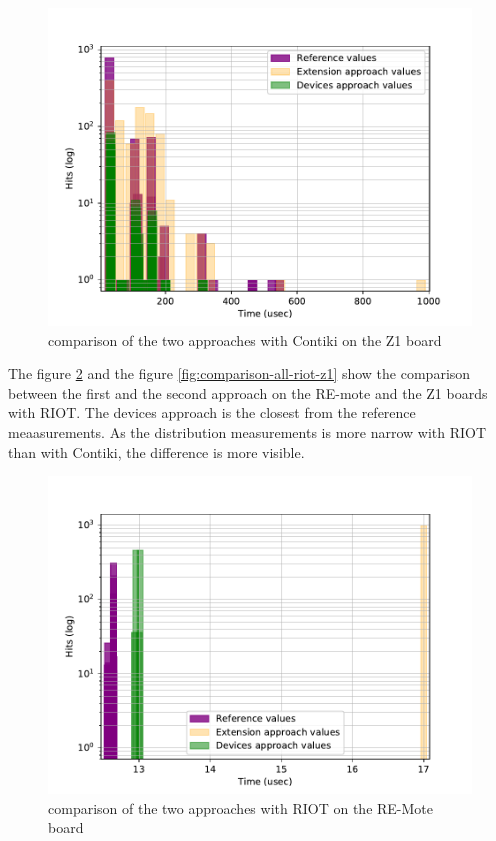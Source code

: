 \begin{figure}[!ht]
  \centering
  \includegraphics[scale=.7]{assets/comparison-all-contiki-z1.pdf}
  \caption{comparison of the two approaches with Contiki on the Z1 board\label{fig:comparison-all-contiki-z1}}
\end{figure}

The figure \ref{fig:comparison-all-riot-remote} and the figure \ref{fig:comparison-all-riot-z1} show the comparison between the first and the second approach on the RE-mote and the Z1 boards with RIOT.
The devices approach is the closest from the reference meaasurements.
As the distribution measurements is more narrow with RIOT than with Contiki, the difference is more visible.

\begin{figure}[!ht]
  \centering
  \includegraphics[scale=.7]{assets/comparison-all-riot-remote.pdf}
  \caption{comparison of the two approaches with RIOT on the RE-Mote board\label{fig:comparison-all-riot-remote}}
\end{figure}

